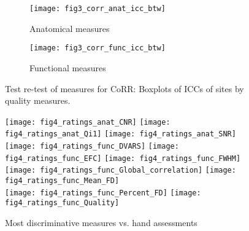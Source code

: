 \begin{figure}[!ht]
  \centering
     \begin{subfigure}[b]{0.4\textwidth}
       \texttt{[image: fig3\_corr\_anat\_icc\_btw]}
       \caption{Anatomical measures}
     \end{subfigure}
     \begin{subfigure}[b]{0.4\textwidth}
       \texttt{[image: fig3\_corr\_func\_icc\_btw]}
       \caption{Functional measures}
     \end{subfigure} 
     \caption{Test re-test of measures for CoRR: Boxplots of ICCs of sites by quality measures.}
\end{figure}

\begin{figure}[!ht]
  \centering
    \texttt{[image: fig4\_ratings\_anat\_CNR]}
    \texttt{[image: fig4\_ratings\_anat\_Qi1]}
    \texttt{[image: fig4\_ratings\_anat\_SNR]}
    \texttt{[image: fig4\_ratings\_func\_DVARS]}
    \texttt{[image: fig4\_ratings\_func\_EFC]}
    \texttt{[image: fig4\_ratings\_func\_FWHM]}
    \texttt{[image: fig4\_ratings\_func\_Global\_correlation]}
    \texttt{[image: fig4\_ratings\_func\_Mean\_FD]} \\
    \texttt{[image: fig4\_ratings\_func\_Percent\_FD]}
    \texttt{[image: fig4\_ratings\_func\_Quality]}
  \caption{Most discriminative measures vs. hand assessments}
\end{figure}

